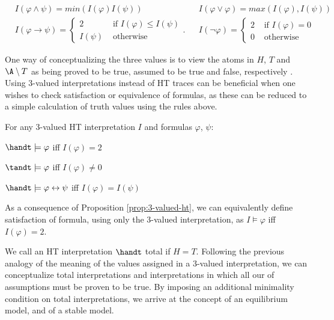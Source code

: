 \begin{align*}
&I(\varphi \wedge \psi) = min(I(\varphi) I(\psi)) 
&&I(\varphi \vee \varphi) = max(I(\varphi),I(\psi)) \\
&I(\varphi \rightarrow \psi) = 
\begin{cases}
  2 & \text { if } I(\varphi) \leq I(\psi) \\
  I(\psi) & \text { otherwise }
\end{cases}.
&&I(\neg \varphi) = \begin{cases}2 
  & \text { if } I(\varphi)=0 \\ 
  0 & \text { otherwise }\end{cases} 
\end{align*}

One way of conceptualizing the three values is to view the atoms in
$H$, $T$ and $\A \setminus T$ as being proved to be true, assumed to
be true and false, respectively \cite{agcadipescscvi20a}. Using
3-valued interpretations instead of HT traces can be beneficial when
one wishes to check satisfaction or equivalence of formulas, as these
can be reduced to a simple calculation of truth values using the rules
above.

\begin{proposition}\label{prop:3-valued-ht}
For any 3-valued HT interpretation $I$ and formulas $\varphi$, $\psi$:
\begin{description}
  \item $\handt \models \varphi$ iff $I(\varphi) = 2$
  \item $\tandt \models \varphi$ iff $I(\varphi) \neq 0$
  \item $\handt \models \varphi \leftrightarrow \psi$ iff $I(\varphi) = I(\psi)$
\end{description}
\end{proposition}

As a consequence of Proposition \ref{prop:3-valued-ht}, we can
equivalently define satisfaction of formula, using only the 3-valued
interpretation, as $I \models \varphi$ iff $I(\varphi)=2$.

We call an HT interpretation $\handt$ total if $H=T$. Following the
previous analogy of the meaning of the values assigned in a 3-valued
interpretation, we can conceptualize total interpretations and
interpretations in which all our of assumptions must be proven to be
true. By imposing an additional minimality condition on total
interpretations, we arrive at the concept of an equilibrium model, and
of a stable model.

